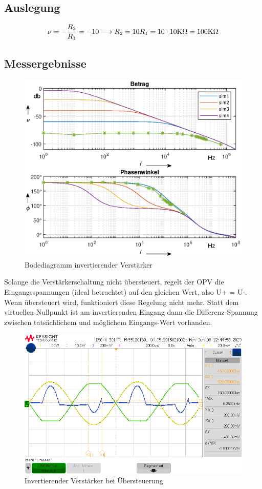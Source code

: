 \subsection{Auslegung}
\begin{align}
    \nu = -\frac{R_2}{R_1} =-10 \longrightarrow R_2 = 10R_1=10\cdot 10\text{K}\Omega =100\text{K}\Omega
\end{align}
\subsection{Messergebnisse}
\begin{figure}[H]
    \centering
    \includegraphics[width=\costumPicWidth]{Lab_1/Plots/inv_verst.eps}
    \caption{Bodediagramm invertierender Verstärker}
    \label{fig:bode_inv_verst}
\end{figure}
Solange die Verstärkerschaltung nicht übersteuert, regelt der OPV die Eingangsspannungen (ideal betrachtet) auf
den gleichen Wert, also U+ = U-. Wenn übersteuert wird, funktioniert diese Regelung nicht mehr. Statt dem
virtuellen Nullpunkt ist am invertierenden Eingang dann die Differenz-Spannung zwischen tatsächlichem und
möglichem Eingangs-Wert vorhanden.
\begin{figure}[H]
    \centering
    \includegraphics[width=\costumPicWidth]{Lab_1/Messungen/inv_verst/scope_40.png}
    \caption{Invertierender Verstärker bei Übersteuerung}
    \label{fig:uberst_verst}
\end{figure}

